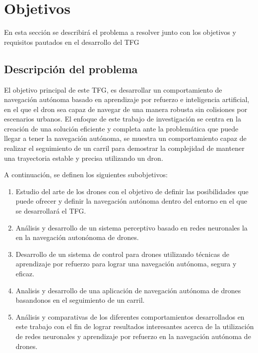 \chapter{Objetivos}
\label{cap:capitulo2}


En esta sección se describirá el problema a resolver junto con los objetivos y requisitos pautados en el desarrollo del TFG


\section{Descripción del problema}
\label{sec:descripcion}

El objetivo principal de este TFG, es desarrollar un comportamiento de navegación autónoma basado en 
aprendizaje por refuerzo e inteligencia artificial, en el que el dron sea capaz de navegar de una manera robusta sin colisiones por escenarios urbanos. El enfoque de este trabajo de investigación 
se centra en la creación de una solución eficiente y completa ante la problemática que puede llegar a tener la navegación autónoma, se 
muestra un comportamiento capaz de realizar el seguimiento de un carril para demostrar la complejidad de mantener una trayectoria estable 
y precisa utilizando un dron. 

A continuación, se definen los siguientes subobjetivos: 

\begin{enumerate}
    \item Estudio del arte de los drones con el objetivo de definir las posibilidades que puede ofrecer y definir 
    la navegación autónoma dentro del entorno en el que se desarrollará el TFG. 
    \item Análisis y desarrollo de un sistema perceptivo basado en redes neuronales la en la navegación autonónoma de drones.
    \item Desarrollo  de un sistema de control para drones utilizando técnicas de aprendizaje por refuerzo para lograr una navegación 
    autónoma, segura y eficaz.
    \item Analisis y desarrollo de una aplicación de navegación autónoma de drones basandonos en el seguimiento de un carril.
    \item Análisis y comparativas de los diferentes comportamientos desarrollados en este trabajo con el fin de 
    lograr resultados interesantes acerca de la utilización de redes neuronales y aprendizaje por refuerzo en la navegación autónoma de drones.
\end{enumerate}
\newpage
